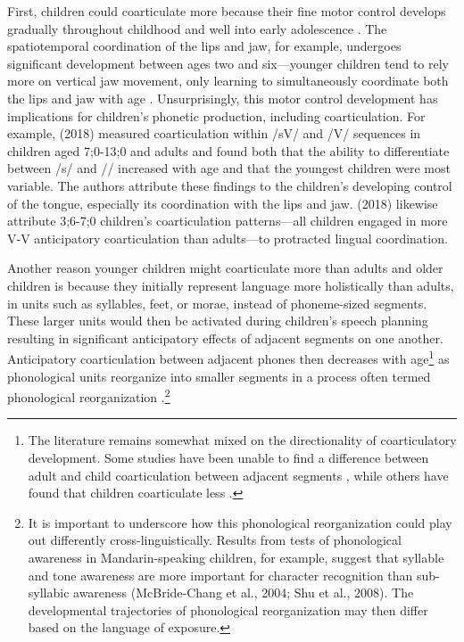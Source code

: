 \documentclass[a4paper,man,natbib,donotrepeattitle, apacite]{apa6}
\begin{document}
First, children could coarticulate more because their fine motor control develops gradually throughout childhood and well into early adolescence \cite{barbierWhatAnticipatoryCoarticulation2020,kentAnatomicalNeuromuscularMaturation1976,perkellFiveDecadesResearch2013,walshArticulatoryMovementsAdolescents2002}. The spatiotemporal coordination of the lips and jaw, for example, undergoes significant development between ages two and six---younger children tend to rely more on vertical jaw movement, only learning to simultaneously coordinate both the lips and jaw with age \cite{greenPhysiologicDevelopmentSpeech2000}. Unsurprisingly, this motor control development has implications for children’s phonetic production, including coarticulation. For example, \citeauthor{zharkovaDynamicsVoicelessSibilant2018} (2018) measured coarticulation within /\textschwa sV/ and /\textschwa \textesh V/ sequences in children aged 7;0-13;0 and adults and found both that the ability to differentiate between /s/ and /\textesh/ increased with age and that the youngest children were most variable. The authors attribute these findings to the children’s developing control of the tongue, especially its coordination with the lips and jaw. \citeauthor{rubertusDevelopmentGesturalOrganization2018}(2018) likewise attribute 3;6-7;0 children’s coarticulation patterns---all children engaged in more V-V anticipatory coarticulation than adults---to protracted lingual coordination.           

Another reason younger children might coarticulate more than adults and older children is because they initially represent language more holistically than adults, in units such as syllables, feet, or morae, instead of phoneme-sized segments. These larger units would then be activated during children’s speech planning resulting in significant anticipatory effects of adjacent segments on one another. Anticipatory coarticulation between adjacent phones then decreases with age\footnote{The literature remains somewhat mixed on the directionality of coarticulatory development. Some studies have been unable to find a difference between adult and child coarticulation between adjacent segments \cite{katzAnticipatoryCoarticulationSpeech1991,noirayDevelopmentMotorSynergies2013,serenoDevelopmentalAspectsLingual1987,zharkovaDynamicsVoicelessSibilant2018}, while others have found that children coarticulate less \cite{kentSegmentalOrganizationSpeech1983}.} as phonological units reorganize into smaller segments in a process often termed phonological reorganization \cite{goodellAcousticEvidenceDevelopment1992,nittrouerEmergencePhoneticSegments1989,nittrouerHowChildrenLearn1996,noiraySpokenLanguageDevelopment2019,noirayHowChildrenOrganize2018,redfordGrammaticalWordProduction2018,zharkovaCoarticulationIndicatorSpeech2011}.\footnote{It is important to underscore how this phonological reorganization could play out differently cross-linguistically. Results from tests of phonological awareness in Mandarin-speaking children, for example, suggest that syllable and tone awareness are more important for character recognition than sub-syllabic awareness (McBride-Chang et al., 2004; Shu et al., 2008). The developmental trajectories of phonological reorganization may then differ based on the language of exposure.}  
\end{document}
